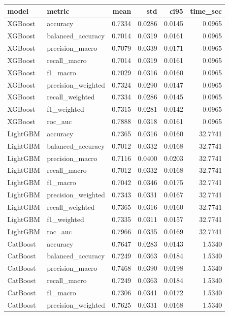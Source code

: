 \begin{tabular}{llrrrr}
\toprule
model & metric & mean & std & ci95 & time_sec \\
\midrule
XGBoost & accuracy & 0.7334 & 0.0286 & 0.0145 & 0.0965 \\
XGBoost & balanced_accuracy & 0.7014 & 0.0319 & 0.0161 & 0.0965 \\
XGBoost & precision_macro & 0.7079 & 0.0339 & 0.0171 & 0.0965 \\
XGBoost & recall_macro & 0.7014 & 0.0319 & 0.0161 & 0.0965 \\
XGBoost & f1_macro & 0.7029 & 0.0316 & 0.0160 & 0.0965 \\
XGBoost & precision_weighted & 0.7324 & 0.0290 & 0.0147 & 0.0965 \\
XGBoost & recall_weighted & 0.7334 & 0.0286 & 0.0145 & 0.0965 \\
XGBoost & f1_weighted & 0.7315 & 0.0281 & 0.0142 & 0.0965 \\
XGBoost & roc_auc & 0.7888 & 0.0318 & 0.0161 & 0.0965 \\
LightGBM & accuracy & 0.7365 & 0.0316 & 0.0160 & 32.7741 \\
LightGBM & balanced_accuracy & 0.7012 & 0.0332 & 0.0168 & 32.7741 \\
LightGBM & precision_macro & 0.7116 & 0.0400 & 0.0203 & 32.7741 \\
LightGBM & recall_macro & 0.7012 & 0.0332 & 0.0168 & 32.7741 \\
LightGBM & f1_macro & 0.7042 & 0.0346 & 0.0175 & 32.7741 \\
LightGBM & precision_weighted & 0.7343 & 0.0331 & 0.0167 & 32.7741 \\
LightGBM & recall_weighted & 0.7365 & 0.0316 & 0.0160 & 32.7741 \\
LightGBM & f1_weighted & 0.7335 & 0.0311 & 0.0157 & 32.7741 \\
LightGBM & roc_auc & 0.7966 & 0.0335 & 0.0169 & 32.7741 \\
CatBoost & accuracy & 0.7647 & 0.0283 & 0.0143 & 1.5340 \\
CatBoost & balanced_accuracy & 0.7249 & 0.0363 & 0.0184 & 1.5340 \\
CatBoost & precision_macro & 0.7468 & 0.0390 & 0.0198 & 1.5340 \\
CatBoost & recall_macro & 0.7249 & 0.0363 & 0.0184 & 1.5340 \\
CatBoost & f1_macro & 0.7306 & 0.0341 & 0.0172 & 1.5340 \\
CatBoost & precision_weighted & 0.7625 & 0.0331 & 0.0168 & 1.5340 \\

\end{tabular}
